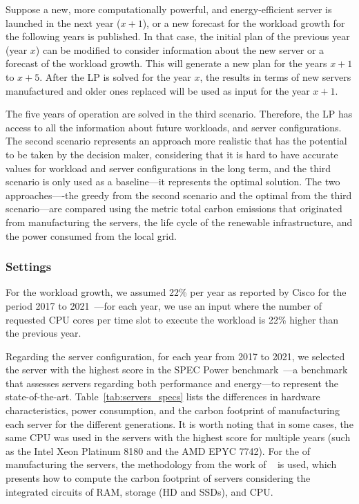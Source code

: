 Suppose a new, more computationally powerful, and energy-efficient server is launched in the next year ($x+1$), or a new forecast for the workload growth for the following years is published. In that case, the initial plan of the previous year (year $x$) can be modified to consider information about the new server or a forecast of the workload growth. This will generate a new plan for the years $x+1$ to $x+5$. After the LP is solved for the year $x$, the results in terms of new servers manufactured and older ones replaced will be used as input for the year $x +1$. 

The five years of operation are solved in the third scenario. Therefore, the LP has access to all the information about future workloads, and server configurations. The second scenario represents an approach more realistic that has the potential to be taken by the decision maker, considering that it is hard to have accurate values for workload and server configurations in the long term, and the third scenario is only used as a baseline---it represents the optimal solution. The two approaches----the greedy from the second scenario and the optimal from the third scenario---are compared using the metric total carbon emissions that originated from manufacturing the servers, the life cycle of the renewable infrastructure, and the power consumed from the local grid.


\subsubsection{Settings}

For the workload growth, we assumed 22\% per year as reported by Cisco for the period 2017 to 2021~\cite{cisco_global_cloud_index_2018}---for each year, we use an input where the number of requested CPU cores per time slot to execute the workload is 22\% higher than the previous year.

Regarding the server configuration, for each year from 2017 to 2021, we selected the server with the highest score in the SPEC Power benchmark~\cite{spec_power}---a benchmark that assesses servers regarding both performance and energy---to represent the state-of-the-art. Table~\ref{tab:servers_specs} lists the differences in hardware characteristics, power consumption, and the carbon footprint of manufacturing each server for the different generations. It is worth noting that in some cases, the same CPU was used in the servers with the highest score for multiple years (such as the Intel Xeon Platinum 8180 and the AMD EPYC 7742). For the  of manufacturing the servers, the methodology from the work of ~\citet{gupta2022_ACT} is used, which presents how to compute the carbon footprint of servers considering the integrated circuits of  RAM, storage (HD and SSDs), and CPU.

